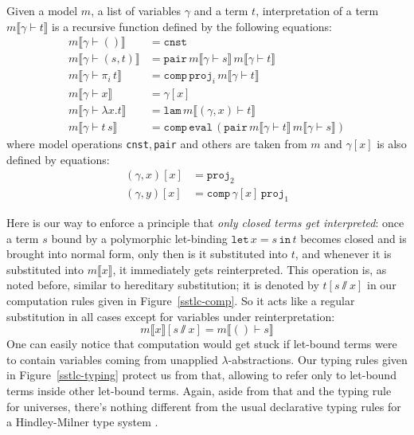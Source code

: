 \begin{definition}
    Given a model $m$, a list of variables $\gamma$ and
    a term $t$, interpretation of a term $m\llbracket
    \gamma\vdash t\rrbracket$ is a recursive function
    defined by the following equations:
    \begin{align}{}
        m\llbracket\gamma\vdash()\rrbracket&=
        \mathtt{cnst}
        \\
        m\llbracket\gamma\vdash(s,t)\rrbracket&=
        \mathtt{pair}
        \,m\llbracket\gamma\vdash s\rrbracket
        \,m\llbracket\gamma\vdash t\rrbracket
        \\
        m\llbracket\gamma\vdash\pi_i\,t\rrbracket&=
        \mathtt{comp}\,\mathtt{proj}_i\,
        m\llbracket\gamma\vdash t\rrbracket
        \\
        m\llbracket\gamma\vdash x\rrbracket&=\gamma[x]
        \\
        m\llbracket\gamma\vdash\lambda x.t\rrbracket&=
        \mathtt{lam}\,
        m\llbracket(\gamma,x)\vdash t\rrbracket
        \\
        m\llbracket\gamma\vdash t\,s\rrbracket&=
        \mathtt{comp}\,\mathtt{eval}\,\left(
        \mathtt{pair}
        \,m\llbracket\gamma\vdash t\rrbracket
        \,m\llbracket\gamma\vdash s\rrbracket
        \right)
    \end{align}
    where model operations \texttt{cnst},\,\texttt{pair}
    and others are taken from $m$ and $\gamma[x]$ is
    also defined by equations:
    \begin{align}
        (\gamma,x)[x] &= \mathtt{proj}_2 \\
        (\gamma,y)[x] &= \mathtt{comp}\,\gamma[x]\,
        \mathtt{proj}_1
    \end{align}
\end{definition}

Here is our way to enforce a principle that \textit{only
closed terms get interpreted}: once a term $s$ bound by
a polymorphic let-binding
$\mathtt{let}\,x=s\,\mathtt{in}\,t$ becomes closed and
is brought into normal form, only then is it
substituted into $t$, and whenever it is substituted
into $m\llbracket x\rrbracket$, it immediately gets
reinterpreted. This operation is, as noted before,
similar to hereditary substitution; it is denoted by
$t[s\sslash x]$ in our computation rules given in
Figure~\ref{sstlc-comp}. So it acts like a regular
substitution in all cases except for variables under
reinterpretation:
\[
    m\llbracket x\rrbracket[s\sslash x] =
    m\llbracket()\vdash s\rrbracket
\]
One can easily notice that computation would get stuck
if let-bound terms were to contain variables coming
from unapplied $\lambda$-abstractions. Our typing rules
given in Figure~\ref{sstlc-typing} protect us from that,
allowing to refer only to let-bound terms inside other
let-bound terms. Again, aside from that and the typing
rule for universes, there's nothing different from the
usual declarative typing rules for a Hindley-Milner type
system \cite{Clement:ML1986,damas1982principal,
milner1978theory}.

